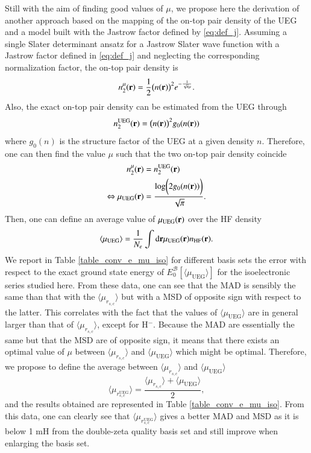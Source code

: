 \documentclass[aip,jcp,reprint,noshowkeys,superscriptaddress,twocolumn]{revtex4-1}
\newcommand{\basis}[0]{\mathcal{B}}
\newcommand{\muueg}{\mu_{\text{UEG}}}
\newcommand{\muuegav}{\langle \mu_{\text{UEG}}\rangle}
\newcommand{\murscav}{\langle \mu_{r_{s,c}}\rangle}
\newcommand{\mursclda}{\langle \mu_{r_{s,c}^{\text{UEG}}}\rangle}
\begin{document}
Still with the aim of finding good values of $\mu$, we propose here the derivation of another approach based on the mapping of the on-top pair density of the UEG and a model built with the Jastrow factor defined by \eqref{eq:def_j}. 
Assuming a single Slater determinant ansatz for a Jastrow Slater wave function with a Jastrow factor defined in \eqref{eq:def_j} and neglecting the corresponding normalization factor, the on-top pair density is 
\begin{equation}
 n_2^\mu({\bf r}) = \frac{1}{2}\big(n({\bf r})\big)^2 e^{-\frac{1}{\sqrt{\pi}\mu}}.
\end{equation}
Also, the exact on-top pair density can be estimated from the UEG through 
\begin{equation}
 n_2^{\text{UEG}}({\bf r}) = \big(n({\bf r})\big)^2g_0(n({\bf r}))
\end{equation}
where $g_0( n)$ is the structure factor of the UEG at a given density $n$. 
Therefore, one can then find the value $\mu$ such that the two on-top pair density coincide
\begin{equation}
 \begin{aligned}
                  n_2^\mu({\bf r}) &= n_2^{\text{UEG}}({\bf r}) \\
 \Leftrightarrow  \muueg({\bf r})  &= \frac{\text{log}\bigg(2 g_0(n({\bf r}))\bigg) }{\sqrt{\pi}}.
 \end{aligned}
\end{equation}
Then, one can define an average value of $\muueg({\bf r})$ over the HF density
\begin{equation}
 \label{eq:mu_av_ueg}
 \muuegav = \frac{1}{N_e}\int \text{d}{\bf r} \muueg({\bf r}) n_{\text{HF}}({\bf r}).
\end{equation}
We report in Table \ref{table_conv_e_mu_iso} for different basis sets the error with respect to the exact ground state energy of $E_0^{\basis}[\muuegav]$ for the isoelectronic series studied here. 
From these data, one can see that the MAD is sensibly the same than that with the $\murscav$ but with a MSD of opposite sign with respect to the latter. This correlates with the fact that the values of $\muuegav$ are in general larger than that of $\murscav$, except for H$^-$. 
Because the MAD are essentially the same but that the MSD are of opposite sign, it means that there exists an optimal value of $\mu$ between $\murscav$ and $\muuegav$ which might be optimal. 
Therefore, we propose to define the average between $\murscav$ and $\muuegav$ 
\begin{equation}
 \label{eq:mu_av_ueg_rsc}
  \mursclda = \frac{\murscav   +   \muuegav }{2},
\end{equation}
and the results obtained are represented in Table \ref{table_conv_e_mu_iso}. From this data, one can clearly see that $\mursclda$ gives a better MAD and MSD as it is below 1 mH from the double-zeta quality basis set and still improve when enlarging the basis set. 
\end{document}
